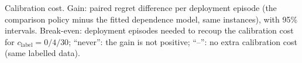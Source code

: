 \begin{table}[!htbp]
\centering\scriptsize\setlength{\tabcolsep}{3pt}
\caption{Calibration cost. Gain: paired regret difference per deployment episode (the comparison policy minus the fitted dependence model, same instances), with 95\% intervals. Break-even: deployment episodes needed to recoup the calibration cost for $c_{\mathrm{label}}=0/4/30$; ``never'': the gain is not positive; ``--'': no extra calibration cost (same labelled data).}
\label{tab:app-calib}
\resizebox{\linewidth}{!}{}
\end{table}
